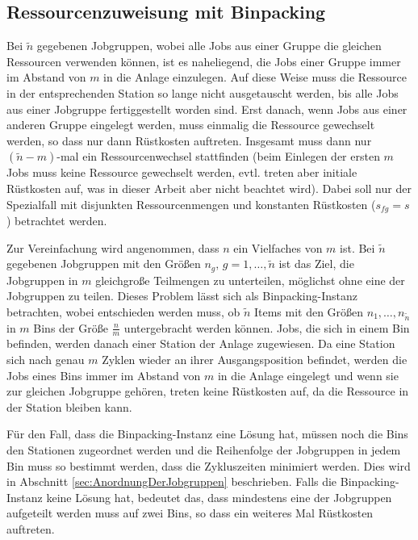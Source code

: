 \documentclass{scrreprt}
\begin{document}

\subsection{Ressourcenzuweisung mit Binpacking}
\label{subsec:RessourcenzuweisungMitBinpacking}
Bei $\tilde{n}$ gegebenen Jobgruppen, wobei alle Jobs aus einer Gruppe die gleichen Ressourcen verwenden können,
ist es naheliegend, die Jobs einer Gruppe immer im Abstand von $m$ in die Anlage einzulegen.
Auf diese Weise muss die Ressource in der entsprechenden Station so lange nicht ausgetauscht werden,
bis alle Jobs aus einer Jobgruppe fertiggestellt worden sind.
Erst danach, wenn Jobs aus einer anderen Gruppe eingelegt werden, muss einmalig die Ressource gewechselt werden,
so dass nur dann Rüstkosten auftreten.
Insgesamt muss dann nur $(\tilde{n}-m)$-mal ein Ressourcenwechsel stattfinden 
(beim Einlegen der ersten $m$ Jobs muss keine Ressource gewechselt werden, evtl. treten aber initiale Rüstkosten auf, was in dieser Arbeit aber nicht beachtet wird).
Dabei soll nur der Spezialfall mit disjunkten Ressourcenmengen und konstanten Rüstkosten ($s_{fg}=s$) betrachtet werden.

Zur Vereinfachung wird angenommen, dass $n$ ein Vielfaches von $m$ ist. 
Bei $\tilde{n}$ gegebenen Jobgruppen mit den Größen $n_g, \, g=1,\ldots,\tilde{n}$ ist das Ziel,
die Jobgruppen in $m$ gleichgroße Teilmengen zu unterteilen, möglichst ohne eine der Jobgruppen zu teilen.
Dieses Problem lässt sich als Binpacking-Instanz betrachten, wobei entschieden werden muss, ob $\tilde{n}$ Items 
mit den Größen $n_1,\ldots,n_{\tilde{n}}$ in $m$ Bins der Größe $\frac{n}{m}$ untergebracht werden können.
Jobs, die sich in einem Bin befinden, werden danach einer Station der Anlage zugewiesen.
Da eine Station sich nach genau $m$ Zyklen wieder an ihrer Ausgangsposition befindet,
werden die Jobs eines Bins immer im Abstand von $m$ in die Anlage eingelegt und wenn sie zur gleichen Jobgruppe gehören, treten keine Rüstkosten auf,
da die Ressource in der Station bleiben kann.

Für den Fall, dass die Binpacking-Instanz eine Lösung hat, müssen noch die Bins den Stationen zugeordnet werden und die Reihenfolge
der Jobgruppen in jedem Bin muss so bestimmt werden, dass die Zykluszeiten minimiert werden.
Dies wird in Abschnitt \ref{sec:AnordnungDerJobgruppen} beschrieben.
Falls die Binpacking-Instanz keine Lösung hat, bedeutet das, dass mindestens eine der Jobgruppen aufgeteilt werden muss auf zwei Bins,
so dass ein weiteres Mal Rüstkosten auftreten.
\end{document}
